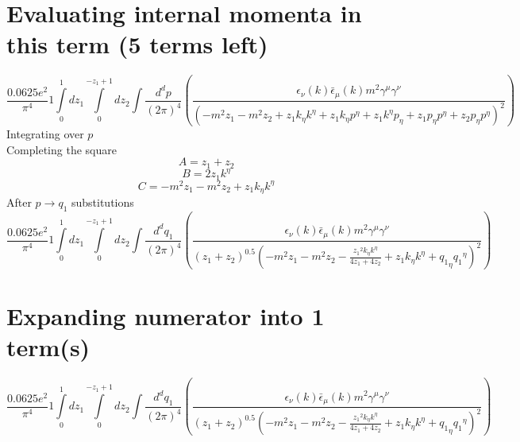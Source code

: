 \section*{Evaluating internal momenta in this term (5 terms left)}
\begin{dmath}\frac{0.0625 e^{2}}{\pi^{4}}1\int\limits_{ 0 }^{ 1 } d{ z_{ 1 } }\int\limits_{ 0 }^{ - { z_{ 1 } } + 1 } d{ z_{ 2 } }\int\frac{d^d p }{ (2\pi)^4 }\left(\frac{\epsilon_{ \nu }({ k }) \bar{\epsilon}_{ \mu }({ k }) m^{2} { \gamma^{ \mu } } { \gamma^{ \nu } }}{\left(- m^{2} { z_{ 1 } } - m^{2} { z_{ 2 } } + { z_{ 1 } } { { k }_{ \eta } } { { k }^{ \eta } } + { z_{ 1 } } { { k }_{ \eta } } { { p }^{ \eta } } + { z_{ 1 } } { { k }^{ \eta } } { { p }_{ \eta } } + { z_{ 1 } } { { p }_{ \eta } } { { p }^{ \eta } } + { z_{ 2 } } { { p }_{ \eta } } { { p }^{ \eta } }\right)^{2}}\right)\end{dmath}
Integrating over $p$\\
Completing the square\
\begin{dmath}A = { z_{ 1 } } + { z_{ 2 } }\end{dmath}
\begin{dmath}B = 2 { z_{ 1 } } { { k }^{ \eta } }\end{dmath}
\begin{dmath}C = - m^{2} { z_{ 1 } } - m^{2} { z_{ 2 } } + { z_{ 1 } } { { k }_{ \eta } } { { k }^{ \eta } }\end{dmath}
After $p \to q_1$ substitutions
\begin{dmath}\frac{0.0625 e^{2}}{\pi^{4}}1\int\limits_{ 0 }^{ 1 } d{ z_{ 1 } }\int\limits_{ 0 }^{ - { z_{ 1 } } + 1 } d{ z_{ 2 } }\int\frac{d^d q_1 }{ (2\pi)^4 }\left(\frac{\epsilon_{ \nu }({ k }) \bar{\epsilon}_{ \mu }({ k }) m^{2} { \gamma^{ \mu } } { \gamma^{ \nu } }}{\left({ z_{ 1 } } + { z_{ 2 } }\right)^{0.5} \left(- m^{2} { z_{ 1 } } - m^{2} { z_{ 2 } } - \frac{{ z_{ 1 } }^{2} { { k }_{ \eta } } { { k }^{ \eta } }}{4 { z_{ 1 } } + 4 { z_{ 2 } }} + { z_{ 1 } } { { k }_{ \eta } } { { k }^{ \eta } } + { { q_1 }_{ \eta } } { { q_1 }^{ \eta } }\right)^{2}}\right)\end{dmath}
\section*{Expanding numerator into 1 term(s)}
\begin{dmath}\frac{0.0625 e^{2}}{\pi^{4}}1\int\limits_{ 0 }^{ 1 } d{ z_{ 1 } }\int\limits_{ 0 }^{ - { z_{ 1 } } + 1 } d{ z_{ 2 } }\int\frac{d^d q_1 }{ (2\pi)^4 }\left(\frac{\epsilon_{ \nu }({ k }) \bar{\epsilon}_{ \mu }({ k }) m^{2} { \gamma^{ \mu } } { \gamma^{ \nu } }}{\left({ z_{ 1 } } + { z_{ 2 } }\right)^{0.5} \left(- m^{2} { z_{ 1 } } - m^{2} { z_{ 2 } } - \frac{{ z_{ 1 } }^{2} { { k }_{ \eta } } { { k }^{ \eta } }}{4 { z_{ 1 } } + 4 { z_{ 2 } }} + { z_{ 1 } } { { k }_{ \eta } } { { k }^{ \eta } } + { { q_1 }_{ \eta } } { { q_1 }^{ \eta } }\right)^{2}}\right)\end{dmath}

